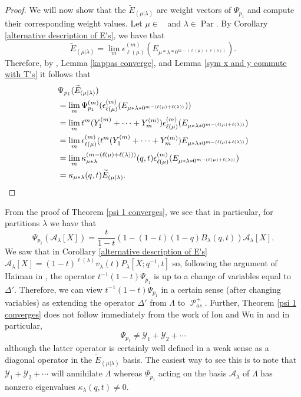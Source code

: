 \documentclass[ALCO,Unicode]{cedram}
\newcommand{\y}{{ \mathscr{Y} }}
\DeclareMathOperator{\sP}{\mathscr{P} }
\DeclareMathOperator{\Par}{\mathrm{Par}}
\DeclareMathOperator{\Compred}{\mathrm{Comp}^{\textit{red}}}
\begin{document}
\begin{proof}
We will now show that the $\widetilde{E}_{(\mu|\lambda)}$ are weight vectors of $\Psi_{p_1}$ and compute their corresponding weight values. Let $\mu \in \Compred$ and $\lambda \in \Par$. By Corollary \ref{alternative description of E's}, we have that 
$$ \widetilde{E}_{(\mu|\lambda)} = \lim_{m} \epsilon_{\ell(\mu)}^{(m)}(E_{\mu*\lambda*0^{m-(\ell(\mu)+\ell(\lambda))}}). $$
Therefore, by \cite[Proposition 6.21]{Ion_2022}, Lemma \ref{kappas converge}, and Lemma \ref{sym x and y commute with T's} it follows that 
\begin{align*}
   & \Psi_{p_1}(\widetilde{E}_{(\mu|\lambda)})\\
   &= \lim_{m} \Psi_{p_1}^{(m)}(\epsilon_{\ell(\mu)}^{(m)}(E_{\mu*\lambda*0^{m-(\ell(\mu)+\ell(\lambda))}}))\\
   &= \lim_{m} t^m(Y_1^{(m)}+\cdots+Y_m^{(m)})\epsilon_{\ell(\mu)}^{(m)}(E_{\mu*\lambda*0^{m-(\ell(\mu)+\ell(\lambda))}})\\
   &= \lim_{m} \epsilon_{\ell(\mu)}^{(m)}( t^m(Y_1^{(m)}+\cdots+Y_m^{(m)})E_{\mu*\lambda*0^{m-(\ell(\mu)+\ell(\lambda))}} )\\
   &= \lim_{m} \kappa_{\mu*\lambda}^{(m-(\ell(\mu)+\ell(\lambda)))}(q,t)\epsilon_{\ell(\mu)}^{(m)}(E_{\mu*\lambda*0^{m-(\ell(\mu)+\ell(\lambda))}})\\
   &= \kappa_{\mu*\lambda}(q,t)\widetilde{E}_{(\mu|\lambda)}. \qedhere
\end{align*} 
\end{proof}

\begin{rema}\label{remark about delta'}
From the proof of Theorem \ref{psi 1 converges}, we see that in particular, for partitions $\lambda$ we have that 
$$\Psi_{p_1}(\mathcal{A}_{\lambda}[X]) = \frac{t}{1-t}(1-(1-t)(1-q)B_{\lambda}(q,t))\mathcal{A}_{\lambda}[X] .$$ We saw that in Corollary \ref{alternative description of E's} $\mathcal{A}_{\lambda}[X] = (1-t)^{\ell(\lambda)}v_{\lambda}(t)P_{\lambda}[X;q^{-1},t]$ so,  following the argument of Haiman in \cite[Definition after Corollary 2.3]{HMacDG}, the operator $t^{-1}(1-t)\Psi_{p_1}$ is up to a change of variables equal to $\Delta'$. Therefore, we can view $t^{-1}(1-t)\Psi_{p_1}$ in a certain sense (after changing variables) as extending the operator $\Delta'$ from $\Lambda$ to $\sP_{as}^{+}$. Further, Theorem \ref{psi 1 converges} does not follow immediately from the work of Ion and Wu in \cite{Ion_2022} and in particular, 
$$ \Psi_{p_1} \neq \y_1+\y_2+ \cdots$$
although the latter operator is certainly well defined in a weak sense as a diagonal operator in the $\widetilde{E}_{(\mu|\lambda)}$ basis. The easiest way to see this is to note that $\y_1+\y_2+ \cdots$ will annihilate $\Lambda$ whereas $\Psi_{p_1}$ acting on the basis $\mathcal{A}_{\lambda}$ of $\Lambda$ has nonzero eigenvalues $\kappa_{\lambda}(q,t) \neq 0$.
\end{rema}
\end{document}
